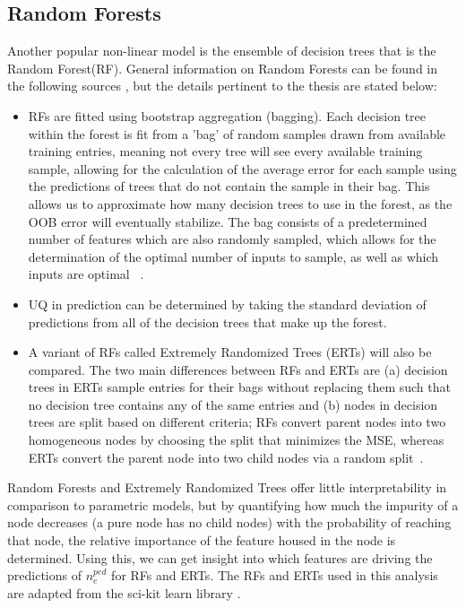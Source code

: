 \documentclass[a4paper, twoside, final, 12pt]{article}
\begin{document}
\subsection{Random Forests}
Another popular non-linear model is the ensemble of decision trees \cite{DT_OG} that is the Random Forest(RF). General information on  Random Forests can be found in the following sources \cite{RF_OG, 598994}, but the details pertinent to the thesis are stated below:
\begin{itemize}
	\item RFs are fitted using bootstrap aggregation (bagging). Each decision tree within the forest is fit from a 'bag' of random samples drawn from available training entries, meaning not every tree will see every available training sample, allowing for the calculation of the average error for each sample using the predictions of trees that do not contain the sample in their bag. This allows us to approximate how many decision trees to use in the forest, as the OOB error will eventually stabilize. The bag consists of a predetermined number of features which are also randomly sampled, which allows for the determination of the optimal number of inputs to sample, as well as which inputs are optimal ~\cite{hastie01statisticallearning}.
	\item UQ in prediction can be determined by taking the standard deviation of predictions from all of the decision trees that make up the forest. 
	\item A variant of RFs called Extremely Randomized Trees (ERTs) will also be compared. The two main differences between RFs and ERTs are (a) decision trees in ERTs sample entries for their bags without replacing them such that no decision tree contains any of the same entries and (b) nodes in decision trees are split based on different criteria; RFs convert parent nodes into two homogeneous nodes by choosing the split that minimizes the MSE, whereas ERTs convert the parent node into two child nodes via a random split~\cite{geurts_extremely_2006}.
\end{itemize}

Random Forests and Extremely Randomized Trees offer little interpretability in comparison to parametric models, but by quantifying how much the impurity of a node decreases (a pure node has no child nodes) with the probability of reaching that node, the relative importance of the feature housed in the node is determined. Using this, we can get insight into which features are driving the predictions of $n_e^{ped}$ for RFs and ERTs. The RFs and ERTs used in this analysis are adapted from the sci-kit learn library \cite{scikit-learn}. 
\end{document}
